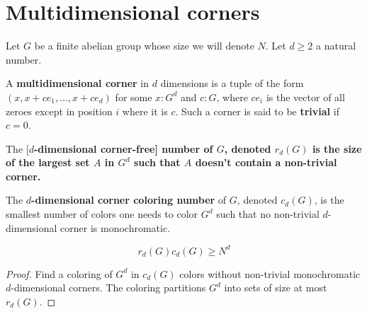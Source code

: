 \chapter{Multidimensional corners}

Let $G$ be a finite abelian group whose size we will denote $N$. Let $d \ge 2$ a natural number.

\begin{definition}
  \label{def:multicorner}
  \uses{}
  \leanok

  A {\bf multidimensional corner} in $d$ dimensions is a tuple of the form $(x, x + ce_1, \dots, x + ce_d)$ for some $x : G^d$ and $c : G$, where $ce_i$ is the vector of all zeroes except in position $i$ where it is $c$. Such a corner is said to be {\bf trivial} if $c = 0$.
\end{definition}

\begin{definition}
  \label{def:corner-free-num}

  The [\bf $d$-dimensional corner-free] number of $G$, denoted $r_d(G)$ is the size of the largest set $A$ in $G^d$ such that $A$ doesn't contain a non-trivial corner.
\end{definition}

\begin{definition}
  \label{def:corner-color-num}

  The {\bf $d$-dimensional corner coloring number} of $G$, denoted $c_d(G)$, is the smallest number of colors one needs to color $G^d$ such that no non-trivial $d$-dimensional corner is monochromatic.
\end{definition}

\begin{lemma}
  \label{lem:corner-num-lower}

  $$r_d(G) c_d(G) \ge N^d$$
\end{lemma}
\begin{proof}

  Find a coloring of $G^d$ in $c_d(G)$ colors without non-trivial monochromatic $d$-dimensional corners. The coloring partitions $G^d$ into sets of size at most $r_d(G)$.
\end{proof}


